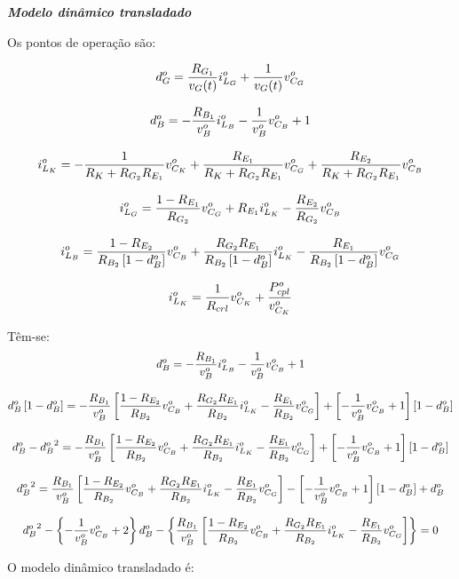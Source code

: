 \documentclass{article}
\newcommand{\nle}{%
  \notag \\[8pt]
}
\begin{document}
\textbf{\textit{Modelo dinâmico transladado}} \vspace*{12pt}

Os pontos de operação são:

\begin{gather}
  d_G^o = \frac{R_{G_1}}{v_G(t)} i_{L_G}^o + \frac{1}{v_G(t)} v_{C_G}^o \nle
  d_B^o = -\frac{R_{B_1}}{v_B^o} i_{L_B}^o - \frac{1}{v_B^o} v_{C_B}^o + 1 \nle
  i_{L_K}^o = - \frac{1}{R_K + R_{G_2} R_{E_1}} v_{C_K}^o  + \frac{R_{E_1}}{R_K + R_{G_2} R_{E_1}} v_{C_G}^o + \frac{R_{E_2}}{R_K + R_{G_2} R_{E_1}} v_{C_B}^o \nle
  i_{L_G}^o = \frac{1 - R_{E_1}}{R_{G_2}} v_{C_G}^o + R_{E_1} i_{L_K}^o - \frac{R_{E_2}}{R_{G_2}} v_{C_B}^o \nle
  i_{L_B}^o = \frac{1 - R_{E_2}}{R_{B_2} \left[1 - d_B^o\right]} v_{C_B}^o + \frac{R_{G_2} R_{E_1}}{R_{B_2} \left[1 - d_B^o\right]} i_{L_K}^o - \frac{R_{E_1}}{R_{B_2} \left[1 - d_B^o\right]} v_{C_G}^o \nle
  i_{L_K}^o = \frac{1}{R_{crl}} v_{C_K}^o + \frac{P_{cpl}^o}{v_{C_K}^o}
\end{gather}

Têm-se:
\begin{gather}
  d_B^o = -\frac{R_{B_1}}{v_B^o} i_{L_B}^o - \frac{1}{v_B^o} v_{C_B}^o + 1 \nle
  d_B^o \left[1 - d_B^o\right]= -\frac{R_{B_1}}{v_B^o} \left[\frac{1 - R_{E_2}}{R_{B_2}} v_{C_B}^o + \frac{R_{G_2} R_{E_1}}{R_{B_2}} i_{L_K}^o - \frac{R_{E_1}}{R_{B_2}} v_{C_G}^o\right] + \left[- \frac{1}{v_B^o} v_{C_B}^o + 1 \right] \left[1 - d_B^o\right]\nle
  d_B^o - {d_B^o}^2 = -\frac{R_{B_1}}{v_B^o} \left[\frac{1 - R_{E_2}}{R_{B_2}} v_{C_B}^o + \frac{R_{G_2} R_{E_1}}{R_{B_2}} i_{L_K}^o - \frac{R_{E_1}}{R_{B_2}} v_{C_G}^o\right] + \left[- \frac{1}{v_B^o} v_{C_B}^o + 1 \right] \left[1 - d_B^o\right]\nle
  {d_B^o}^2 = \frac{R_{B_1}}{v_B^o} \left[\frac{1 - R_{E_2}}{R_{B_2}} v_{C_B}^o + \frac{R_{G_2} R_{E_1}}{R_{B_2}} i_{L_K}^o - \frac{R_{E_1}}{R_{B_2}} v_{C_G}^o\right] - \left[- \frac{1}{v_B^o} v_{C_B}^o + 1 \right] \left[1 - d_B^o\right] + d_B^o\nle
  {d_B^o}^2 - \left\{- \frac{1}{v_B^o} v_{C_B}^o + 2 \right\} d_B^o - \left\{\frac{R_{B_1}}{v_B^o} \left[\frac{1 - R_{E_2}}{R_{B_2}} v_{C_B}^o + \frac{R_{G_2} R_{E_1}}{R_{B_2}} i_{L_K}^o - \frac{R_{E_1}}{R_{B_2}} v_{C_G}^o\right]\right\} = 0
\end{gather}

O modelo dinâmico transladado é:
\end{document}
